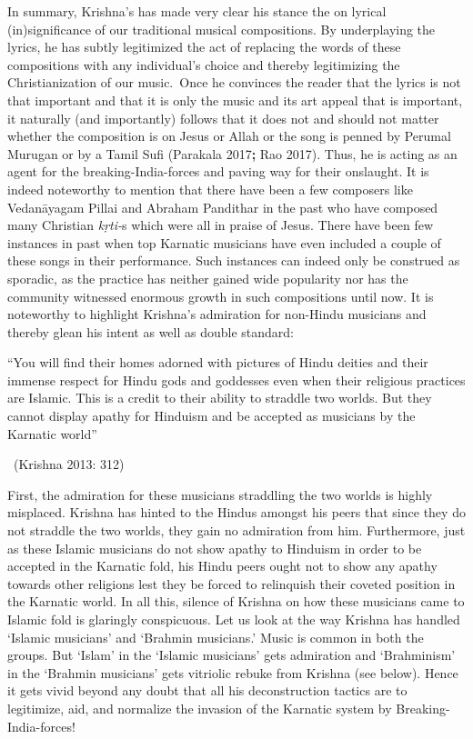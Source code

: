 In summary, Krishna’s has made very clear his stance the on lyrical (in)significance of our traditional musical compositions. By underplaying the lyrics, he has subtly legitimized the act of replacing the words of these compositions with any individual’s choice and thereby legitimizing the Christianization of our music.~Once he convinces the reader that the lyrics is not that important and that it is only the music and its art appeal that is important, it naturally (and importantly) follows that it does not and should not matter whether the composition is on Jesus or Allah or the song is penned by Perumal Murugan or by a Tamil Sufi (Parakala 2017\textbf{; }Rao 2017). Thus, he is acting as an agent for the breaking-India-forces and paving way for their onslaught. It is indeed noteworthy to mention that there have been a few composers like Vedanāyagam Pillai and Abraham Pandithar in the past who have composed many Christian \textit{kṛti-}s which were all in praise of Jesus. There have been few instances in past when top Karnatic musicians have even included a couple of these songs in their performance. Such instances can indeed only be construed as sporadic, as the practice has neither gained wide popularity nor has the community witnessed enormous growth in such compositions until now. It is noteworthy to highlight Krishna’s admiration for non-Hindu musicians and thereby glean his intent as well as double standard:

\begin{myquote}
“You will find their homes adorned with pictures of Hindu deities and their immense respect for Hindu gods and goddesses even when their religious practices are Islamic. This is a credit to their ability to straddle two worlds. But they cannot display apathy for Hinduism and be accepted as musicians by the Karnatic world” 

~\hfill (Krishna 2013: 312)
\end{myquote}

First, the admiration for these musicians straddling the two worlds is highly misplaced. Krishna has hinted to the Hindus amongst his peers that since they do not straddle the two worlds, they gain no admiration from him. Furthermore, just as these Islamic musicians do not show apathy to Hinduism in order to be accepted in the Karnatic fold, his Hindu peers ought not to show any apathy towards other religions lest they be forced to relinquish their coveted position in the Karnatic world. In all this, silence of Krishna on how these musicians came to Islamic fold is glaringly conspicuous. Let us look at the way Krishna has handled ‘Islamic musicians’ and ‘Brahmin musicians.’ Music is common in both the groups. But ‘Islam’ in the ‘Islamic musicians’ gets admiration and ‘Brahminism’ in the ‘Brahmin musicians’ gets vitriolic rebuke from Krishna (see below). Hence it gets vivid beyond any doubt that all his deconstruction tactics are to legitimize, aid, and normalize the invasion of the Karnatic system by Breaking-India-forces!

